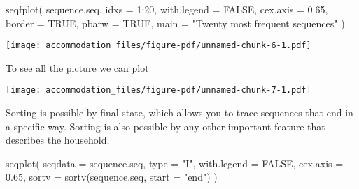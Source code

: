 \documentclass[
  letterpaper,
  DIV=11,
  numbers=noendperiod]{scrreprt}
\newenvironment{Shaded}{\begin{snugshade}}{\end{snugshade}}
\newcommand{\AttributeTok}[1]{\textcolor[rgb]{0.40,0.45,0.13}{#1}}
\newcommand{\CommentTok}[1]{\textcolor[rgb]{0.37,0.37,0.37}{#1}}
\newcommand{\ConstantTok}[1]{\textcolor[rgb]{0.56,0.35,0.01}{#1}}
\newcommand{\DecValTok}[1]{\textcolor[rgb]{0.68,0.00,0.00}{#1}}
\newcommand{\FloatTok}[1]{\textcolor[rgb]{0.68,0.00,0.00}{#1}}
\newcommand{\FunctionTok}[1]{\textcolor[rgb]{0.28,0.35,0.67}{#1}}
\newcommand{\NormalTok}[1]{\textcolor[rgb]{0.00,0.23,0.31}{#1}}
\newcommand{\SpecialCharTok}[1]{\textcolor[rgb]{0.37,0.37,0.37}{#1}}
\newcommand{\StringTok}[1]{\textcolor[rgb]{0.13,0.47,0.30}{#1}}
\begin{document}
\begin{Shaded}
\begin{Highlighting}[]
\FunctionTok{seqfplot}\NormalTok{(}
\NormalTok{  sequence.seq, }\AttributeTok{idxs =} \DecValTok{1}\SpecialCharTok{:}\DecValTok{20}\NormalTok{,}
  \AttributeTok{with.legend =} \ConstantTok{FALSE}\NormalTok{, }\AttributeTok{cex.axis =} \FloatTok{0.65}\NormalTok{,}
  \AttributeTok{border =} \ConstantTok{TRUE}\NormalTok{, }\AttributeTok{pbarw =} \ConstantTok{TRUE}\NormalTok{,}
  \AttributeTok{main =} \StringTok{"Twenty most frequent sequences"}
\NormalTok{)}
\end{Highlighting}
\end{Shaded}

\texttt{[image: accommodation\_files/figure-pdf/unnamed-chunk-6-1.pdf]}

To see all the picture we can plot

\begin{Shaded}
\end{Shaded}

\texttt{[image: accommodation\_files/figure-pdf/unnamed-chunk-7-1.pdf]}

Sorting is possible by final state, which allows you to trace sequences
that end in a specific way. Sorting is also possible by any other
important feature that describes the household.

\begin{Shaded}
\begin{Highlighting}[]
\FunctionTok{seqplot}\NormalTok{(}
  \AttributeTok{seqdata =}\NormalTok{ sequence.seq, }\AttributeTok{type =} \StringTok{"I"}\NormalTok{,}
  \AttributeTok{with.legend =} \ConstantTok{FALSE}\NormalTok{, }\AttributeTok{cex.axis =} \FloatTok{0.65}\NormalTok{,}
  \AttributeTok{sortv =} \FunctionTok{sortv}\NormalTok{(sequence.seq, }\AttributeTok{start =} \StringTok{"end"}\NormalTok{)}
\NormalTok{)}
\end{Highlighting}
\end{Shaded}
\end{document}
